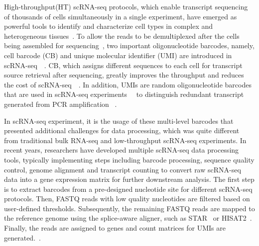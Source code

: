 \documentclass[10pt,journal,compsoc]{IEEEtran}
\begin{document}
High-throughput(HT) scRNA-seq protocols, which enable transcript sequencing of thousands of cells simultaneously in a single experiment, have emerged as powerful tools to identify and characterize cell types in complex and heterogeneous tissues~\cite{Zhang2019ComparativeAO}.
To allow the reads to be demultiplexed after the cells being assembled for sequencing~\cite{Tian2018scPipe}, two important oligonucleotide barcodes, namely, cell barcode (CB) and unique molecular identifier (UMI) are introduced in scRNA-seq~\cite{Rosenberg2018SinglecellPO}~\cite{Cao2017ComprehensiveSC}. 
CB, which assigns different sequences to each cell for transcript source retrieval after sequencing, greatly improves the throughput and reduces the cost of scRNA-seq~\cite{Macosko2015HighlyPG}~\cite{Klein2015DropletBF}. 
In addition, UMIs are random oligonucleotide barcodes that are used in scRNA-seq experiments~\cite{Kivioja2012Counting}~\cite{Camara2017Methods} to distinguish redundant transcript generated from PCR amplification ~\cite{Smith2017UMItools}.

In scRNA-seq experiment, it is the usage of these multi-level barcodes that presented additional challenges for data processing, which was quite different from traditional bulk RNA-seq and low-throughput scRNA-seq experiments. 
In recent years, researchers have developed multiple scRNA-seq data processing tools, typically implementing steps including barcode processing, sequence quality control, genome alignment and transcript counting to convert raw scRNA-seq data into a gene expression matrix for further downstream analysis. 
The first step is to extract barcodes from a pre-designed nucleotide site for different scRNA-seq protocols. Then, FASTQ reads with low quality nucleotides are filtered based on user-defined thresholds. 
Subsequently, the remaining FASTQ reads are mapped to the reference genome using the splice-aware aligner, such as STAR~\cite{Dobin2013STAR} or HISAT2~\cite{Kim2015HISAT}. 
Finally, the reads are assigned to genes and count matrices for UMIs are generated.~\cite{Parekh2018zUMIs}. 
\end{document}
